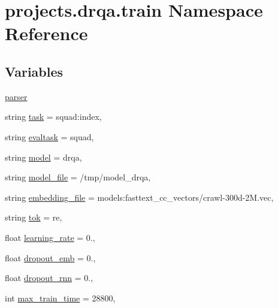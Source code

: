 \hypertarget{namespaceprojects_1_1drqa_1_1train}{}\section{projects.\+drqa.\+train Namespace Reference}
\label{namespaceprojects_1_1drqa_1_1train}
\subsection*{Variables}
\begin{DoxyCompactItemize}
\item 
\hyperlink{namespaceprojects_1_1drqa_1_1train_a2f0306b8f4cc49723a361d3d6fded6ec}{parser}
\item 
string \hyperlink{namespaceprojects_1_1drqa_1_1train_a3dfcd7580566e88a96fb14c78ce92429}{task} = \textquotesingle{}squad\+:index\textquotesingle{},
\item 
string \hyperlink{namespaceprojects_1_1drqa_1_1train_a9649f2061807e188ec80c4bae2a27d6c}{evaltask} = \textquotesingle{}squad\textquotesingle{},
\item 
string \hyperlink{namespaceprojects_1_1drqa_1_1train_a6fafb956e240550a285ea96395357894}{model} = \textquotesingle{}drqa\textquotesingle{},
\item 
string \hyperlink{namespaceprojects_1_1drqa_1_1train_a4875df678fc9b5ea237206090987ef28}{model\+\_\+file} = \textquotesingle{}/tmp/model\+\_\+drqa\textquotesingle{},
\item 
string \hyperlink{namespaceprojects_1_1drqa_1_1train_ae08178321afc1c8053ea714bb12d9483}{embedding\+\_\+file} = \textquotesingle{}models\+:fasttext\+\_\+cc\+\_\+vectors/crawl-\/300d-\/2\+M.\+vec\textquotesingle{},
\item 
string \hyperlink{namespaceprojects_1_1drqa_1_1train_ad3d045011052d0cc6e45d083e36e671f}{tok} = \textquotesingle{}re\textquotesingle{},
\item 
float \hyperlink{namespaceprojects_1_1drqa_1_1train_a871200e87c4f19ec406deee690e65c15}{learning\+\_\+rate} = 0.,
\item 
float \hyperlink{namespaceprojects_1_1drqa_1_1train_a6f59838fa577eadc3abd789bd504912b}{dropout\+\_\+emb} = 0.,
\item 
float \hyperlink{namespaceprojects_1_1drqa_1_1train_aa4367f126c2df4a2d3052faf825348cf}{dropout\+\_\+rnn} = 0.,
\item 
int \hyperlink{namespaceprojects_1_1drqa_1_1train_a5581784079fc128b1fffdb4b4e975e8b}{max\+\_\+train\+\_\+time} = 28800,

\end{DoxyCompactItemize}
